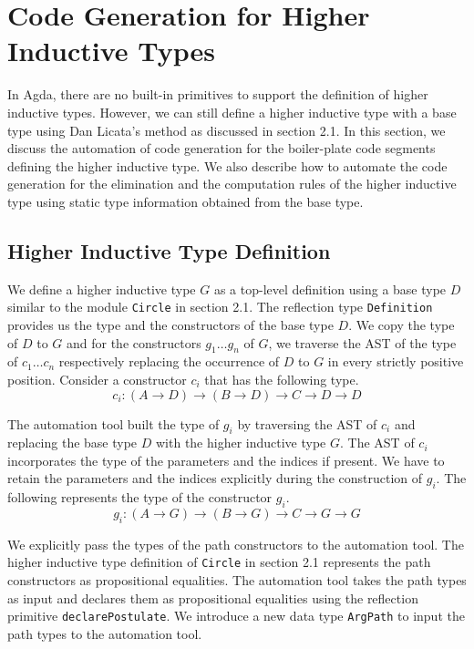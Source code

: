 \documentclass[sigplan,10pt]{acmart}
\begin{document}
\section{Code Generation for Higher Inductive Types}
\label{sec:sec4}

In Agda, there are no built-in primitives to support the definition of higher inductive types. However, we can still define a higher inductive type with a base type using Dan Licata's \citep{Licata-2011} method as discussed in section 2.1. In this section, we discuss the automation of code generation for the boiler-plate code segments defining the higher inductive type. We also describe how to automate the code generation for the elimination and the computation rules of the higher inductive type using static type information obtained from the base type.


\subsection{Higher Inductive Type Definition}
\label{sec:sec4.1}

We define a higher inductive type $G$ as a top-level definition using a base type $D$ similar to the module {\tt Circle} in section 2.1. The reflection type {\tt Definition} provides us the type and the constructors of the base type $D$. We copy the type of $D$ to $G$ and for the constructors $g_1 \ldots g_n$ of $G$, we traverse the AST of the type of $c_1 \ldots c_n$ respectively replacing the occurrence of $D$ to $G$ in every strictly positive position. Consider a constructor $c_i$ that has the following type.
\begin{equation}
c_i : (A \rightarrow D) \rightarrow (B \rightarrow D) \rightarrow C \rightarrow D \rightarrow D \nonumber
\end{equation}

The automation tool built the type of $g_i$ by traversing the AST of $c_i$ and replacing the base type $D$ with the higher inductive type $G$. The AST of $c_i$ incorporates the type of the parameters and the indices if present. We have to retain the parameters and the indices explicitly during the construction of $g_i$. The following represents the type of the constructor $g_i$.
\begin{equation}
g_i : (A \rightarrow G) \rightarrow (B \rightarrow G) \rightarrow C \rightarrow G \rightarrow G \nonumber
\end{equation}

We explicitly pass the types of the path constructors to the automation tool. The higher inductive type definition of {\tt Circle} in section 2.1 represents the path constructors as propositional equalities. The automation tool takes the path types as input and declares them as propositional equalities using the reflection primitive {\tt declarePostulate}. We introduce a new data type {\tt ArgPath} to input the path types to the automation tool.
\end{document}
